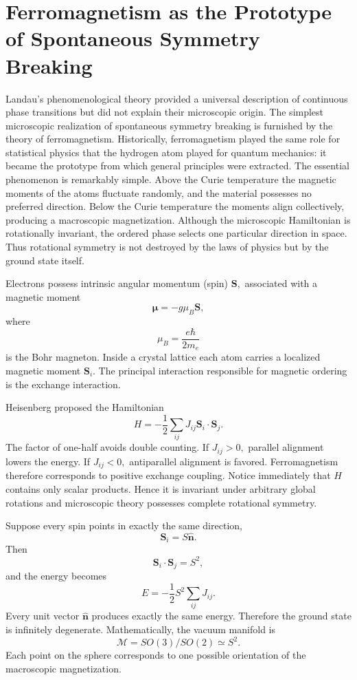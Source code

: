 \section{Ferromagnetism as the Prototype of Spontaneous Symmetry Breaking}
\label{sec:ferromagnetism}
Landau's phenomenological theory provided a universal description of
continuous phase transitions but did not explain their microscopic
origin. The simplest microscopic realization of spontaneous symmetry
breaking is furnished by the theory of ferromagnetism.
Historically, ferromagnetism played the same role for statistical
physics that the hydrogen atom played for quantum mechanics: it became
the prototype from which general principles were extracted.
The essential phenomenon is remarkably simple. Above the Curie
temperature the magnetic moments of the atoms fluctuate randomly, and
the material possesses no preferred direction. Below the Curie
temperature the moments align collectively, producing a macroscopic
magnetization. Although the microscopic Hamiltonian is rotationally
invariant, the ordered phase selects one particular direction in space.
Thus rotational symmetry is not destroyed by the laws of physics but by
the ground state itself.

Electrons possess intrinsic angular momentum (spin) $\mathbf S,$
associated with a magnetic moment
\[\boldsymbol{\mu}=-g \mu_B \mathbf S,\]
where
\[\mu_B =\frac{e\hbar}{2m_e}\]
is the Bohr magneton.
Inside a crystal lattice each atom carries a localized magnetic moment
$ \mathbf S_i.$
The principal interaction responsible for magnetic ordering is the
exchange interaction.

Heisenberg proposed the Hamiltonian
\[H=-\frac{1}{2} \sum_{ij}J_{ij}\mathbf S_i\cdot\mathbf S_j.\]
The factor of one-half avoids double counting.
If $J_{ij}>0,$ parallel alignment lowers the energy.
If $J_{ij}<0,$ antiparallel alignment is favored.
Ferromagnetism therefore corresponds to positive exchange coupling.
Notice immediately that $H$ contains only scalar products.
Hence it is invariant under arbitrary global rotations 
and microscopic theory possesses complete rotational symmetry.

Suppose every spin points in exactly the same direction,
\[\mathbf S_i=S\hat{\mathbf n}.\]
Then
\[\mathbf S_i\cdot\mathbf S_j=S^2,\]
and the energy becomes
\[E=-\frac{1}{2} S^2 \sum_{ij} J_{ij}.\]
Every unit vector $\hat{\mathbf n}$ produces exactly the same energy.
Therefore the ground state is infinitely degenerate.
Mathematically, the vacuum manifold is
\[\mathcal M=SO(3)/SO(2)\simeq S^2.\]
Each point on the sphere corresponds to one possible orientation of the
macroscopic magnetization.

